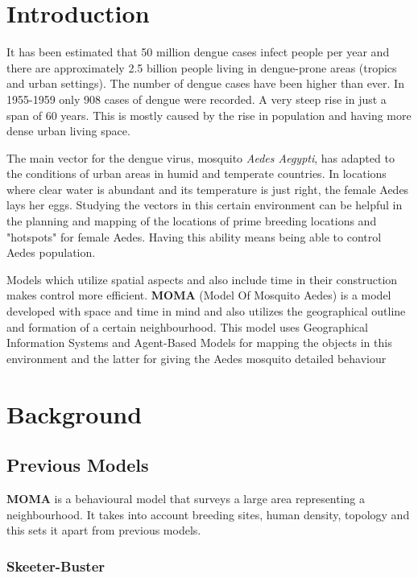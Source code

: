 \section{Introduction}

It has been estimated that 50 million dengue cases infect people per year and there are approximately 2.5 billion people living in dengue-prone areas (tropics and urban settings). The number of dengue cases have been higher than ever. In 1955-1959 only 908 cases of dengue were recorded. A very steep rise in just a span of 60 years. This is mostly caused by the rise in population and having more dense urban living space.

The main vector for the dengue virus, mosquito \textit{Aedes Aegypti}, has adapted to the conditions of urban areas in humid and temperate countries. In locations where clear water is abundant and its temperature is just right, the female Aedes lays her eggs. Studying the vectors in this certain environment can be helpful in the planning and mapping of the locations of prime breeding locations and "hotspots" for female Aedes. Having this ability means being able to control Aedes population.

Models which utilize spatial aspects and also include time in their construction makes control more efficient. \textbf{MOMA} (Model Of Mosquito Aedes) is a model developed with space and time in mind and also utilizes the geographical outline and formation of a certain neighbourhood. This model uses Geographical Information Systems and Agent-Based Models for mapping the objects in this environment and the latter for giving the Aedes mosquito detailed behaviour

\section{Background}



\subsection{Previous Models}

\textbf{MOMA} is a behavioural model that surveys a large area representing a neighbourhood. It takes into account breeding sites, human density, topology and this sets it apart from previous models.

\subsubsection{Skeeter-Buster} 


